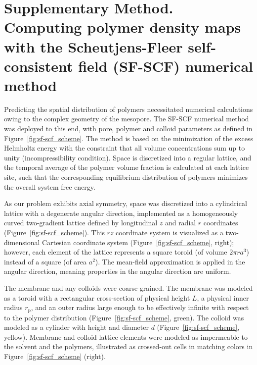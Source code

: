 \documentclass[10pt, a4paper]{article}
\begin{document}
\section{Supplementary Method. Computing polymer density maps with the Scheutjens-Fleer self-consistent field (SF-SCF) numerical method}
\begin{multicols}{2}


Predicting the spatial distribution of polymers necessitated numerical calculations owing to the complex geometry of the mesopore. 
The SF-SCF numerical method was deployed to this end, with pore, polymer and colloid parameters as defined in Figure~\ref{fig:sf-scf_scheme}.
The method is based on the minimization of the excess Helmholtz energy with the constraint that all volume concentrations sum up to unity (incompressibility condition).
Space is discretized into a regular lattice, and the temporal average of the polymer volume fraction is calculated at each lattice site, such that the corresponding equilibrium distribution of polymers minimizes the overall system free energy.

As our problem exhibits axial symmetry, space was discretized into a cylindrical lattice with a degenerate angular direction,
implemented as a homogeneously curved two-gradient lattice defined by longitudinal $z$ and radial $r$ coordinates (Figure~\ref{fig:sf-scf_scheme}).
This $rz$ coordinate system is visualized as a two-dimensional Cartesian coordinate system (Figure~\ref{fig:sf-scf_scheme}, right); however, each element of the lattice represents a square toroid (of volume $2 \pi r a^3$) instead of a square (of area $a^2$).
The mean-field approximation is applied in the angular direction, meaning properties in the angular direction are uniform.

The membrane and any colloids were coarse-grained.
The membrane was modeled as a toroid with a rectangular cross-section of physical height $L$, a physical inner radius $r_{\text{p}}$, and an outer radius large enough to be effectively infinite with respect to the polymer distribution (Figure~\ref{fig:sf-scf_scheme}, green).
The colloid was modeled as a cylinder with height and diameter $d$ (Figure~\ref{fig:sf-scf_scheme}, yellow).
Membrane and colloid lattice elements were modeled as impermeable to the solvent and the polymers, illustrated as crossed-out cells in matching colors in Figure~\ref{fig:sf-scf_scheme} (right).


\end{multicols}
\end{document}
